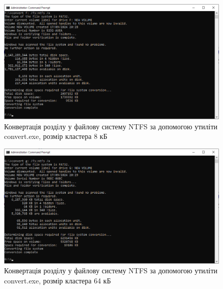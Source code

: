 \documentclass[oneside,14pt]{extarticle}
\begin{document}
\begin{normalsize}
	\begin{figure}[H]
		\centering
		\includegraphics[scale=0.5]{8}
		\caption{Конвертація розділу у файлову систему NTFS за допомогою утиліти convert.exe, розмір кластера 8 кБ}
	\end{figure}
	
	\begin{figure}[H]
		\centering
		\includegraphics[scale=0.5]{9}
		\caption{Конвертація розділу у файлову систему NTFS за допомогою утиліти convert.exe, розмір кластера 64 кБ}
	\end{figure}
	

\end{normalsize}
\end{document}
